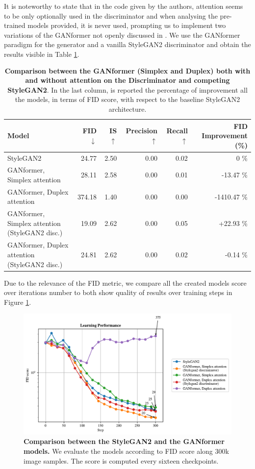 \documentclass{article}
\begin{document}
	It is noteworthy to state that in the code given by the authors, attention seems to be only optionally 
	used in the discriminator and when analysing the pre-trained models provided, it is never used,
	prompting us to implement two variations of the GANformer not openly 
	discussed in \cite{hudson2021generative}.
	We use the GANformer paradigm for the generator and a vanilla StyleGAN2 discriminator and 
	obtain the results visible in Table \ref{tab:our-results2}.
	\begin{table}[htb]
		\centering
		\caption{\textbf{Comparison between the GANformer (Simplex and Duplex) both with and without 
				attention on the Discriminator and competing StyleGAN2}.  In the last column, is reported 
				the 
			percentage of improvement all the models, in terms of FID score, with respect to the baseline 
			StyleGAN2 architecture.}
		\label{tab:our-results2}
		\vspace{3mm}
		\small
		\begin{tabular}{l|rrrrr}
			\toprule
			Model                        & FID $\downarrow$  & IS $\uparrow$& Precision $\uparrow$& Recall 
			$\uparrow$& FID Improvement (\%)\\ 
			\midrule
			StyleGAN2                    &  24.77 & 2.50 & 0.00 & 0.02 & 0 \%\\ 
			GANformer, Simplex attention & 28.11 & 2.58 & 0.00 & 0.01 & -13.47 \%\\ 
			GANformer, Duplex attention  & 374.18 & 1.40 & 0.00 & 0.00 & -1410.47  \%\\ 
			GANformer, Simplex attention (StyleGAN2 disc.) & 19.09 &  2.62  &  0.00    & 0.05  & 
			+22.93 \% \\ 
			GANformer, Duplex attention (StyleGAN2 disc.)  &  24.81  & 2.62 &   0.00   & 0.02 & 
			-0.14 \%\\ 
			\bottomrule
		\end{tabular}
	\end{table}
	
	Due to the relevance of the FID metric, we compare all the created models score over iterations 
	number to both show quality of results over training steps in Figure \ref{fig:performance}.
	\begin{figure}[htpb]				
		\centering
		\raggedleft
		\includegraphics[width=.8\linewidth]{FIDscore.pdf}
		\caption{\textbf{Comparison between the StyleGAN2 and the GANformer models.} We evaluate 
			the models according to FID score along 300k image samples. The score is computed every 
			sixteen checkpoints.}
		\label{fig:performance}
	\end{figure}
	
\end{document}
